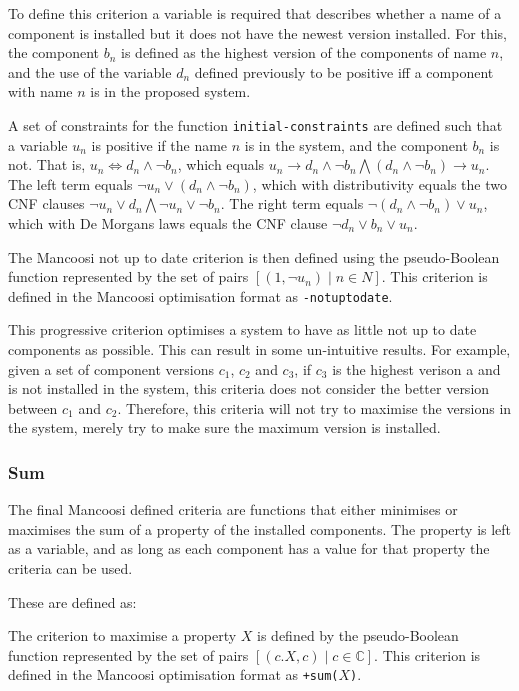 To define this criterion a variable is required that describes whether a name of a component is installed but it does not have the newest version installed.
For this, the component $b_n$ is defined as the highest version of the components of name $n$,
and the use of the variable $d_n$ defined previously to be positive iff a component with name $n$ is in the proposed system.

A set of constraints for the function \verb+initial-constraints+ are defined
such that a variable $u_n$ is positive if the name $n$ is in the system, and the component $b_n$ is not.
That is, $u_n \Leftrightarrow d_n \wedge \neg b_n$, which equals
$u_n \rightarrow d_n \wedge \neg b_n \bigwedge (d_n \wedge \neg b_n) \rightarrow u_n$.
The left term equals $\neg u_n \vee (d_n \wedge \neg b_n)$, 
which with distributivity equals the two CNF clauses $\neg u_n \vee d_n \bigwedge \neg u_n \vee \neg b_n$.
The right term equals $\neg (d_n \wedge \neg b_n) \vee u_n$,
which with De Morgans laws equals the CNF clause $\neg d_n \vee b_n \vee u_n$. 

\begin{defs}
The Mancoosi not up to date criterion is then defined using the pseudo-Boolean function
represented by the set of pairs $[(1,\neg u_n) \mid n \in N]$.
This criterion is defined in the Mancoosi optimisation format as \verb+-notuptodate+.
\end{defs}


This progressive criterion optimises a system to have as little not up to date components as possible.
This can result in some un-intuitive results.
For example, given a set of component versions $c_1$, $c_2$ and $c_3$, if $c_3$ is the highest verison a and is not installed in the system, 
this criteria does not consider the better version between $c_1$ and $c_2$.
Therefore, this criteria will not try to maximise the versions in the system, merely try to make sure the maximum version is installed.

\subsubsection{Sum}
The final Mancoosi defined criteria are functions that either minimises or maximises the sum of a property of the installed components. 
The property is left as a variable, and as long as each component has a value for that property the criteria can be used.

These are defined as:
\begin{defs}
The criterion to maximise a property $X$ is defined by the pseudo-Boolean function 
represented by the set of pairs $[(c.X, c) \mid c \in \mathbb{C}]$.
This criterion is defined in the Mancoosi optimisation format as \verb!+sum(!$X$\verb+)+.
\end{defs}

